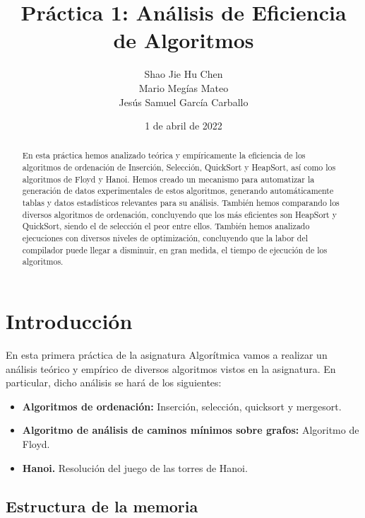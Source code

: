 \documentclass{homework}
\title{Práctica 1: Análisis de Eficiencia de Algoritmos}
\author{Shao Jie Hu Chen \\ Mario Megías Mateo \\ Jesús Samuel García Carballo}
\date{1 de abril de 2022}
\begin{document}
	\maketitle

    \newpage

    \begin{abstract}
		En esta práctica hemos analizado teórica y empíricamente la eficiencia de los algoritmos de 
        ordenación de Inserción, Selección,
        QuickSort y HeapSort, así como los algoritmos de Floyd y Hanoi. Hemos creado un mecanismo para automatizar
        la generación de datos experimentales de estos algoritmos, generando automáticamente tablas y datos estadísticos
        relevantes para su análisis. También hemos comparando los diversos algoritmos de ordenación, concluyendo que
        los más eficientes son HeapSort y QuickSort, siendo el de selección el peor entre ellos. También hemos
        analizado ejecuciones con diversos niveles de optimización, concluyendo que la labor del compilador puede llegar
        a disminuir, en gran medida, el tiempo de ejecución de los algoritmos. 
	\end{abstract}
	
    \newpage

	\tableofcontents
    \newpage
    \listoftables
	\newpage
	\setcounter{page}{1}
	
	\section{Introducción}

    En esta primera práctica de la asignatura Algorítmica vamos a realizar un análisis teórico y empírico de
    diversos algoritmos vistos en la asignatura. En particular, dicho análisis se hará de los siguientes:

    \begin{itemize}
        \item \textbf{Algoritmos de ordenación:} Inserción, selección, quicksort y mergesort. 
        \item \textbf{Algoritmo de análisis de caminos mínimos sobre grafos:} Algoritmo de Floyd.
        \item \textbf{Hanoi.} Resolución del juego de las torres de Hanoi. 
    \end{itemize}

    \subsection{Estructura de la memoria}
    
\end{document}
